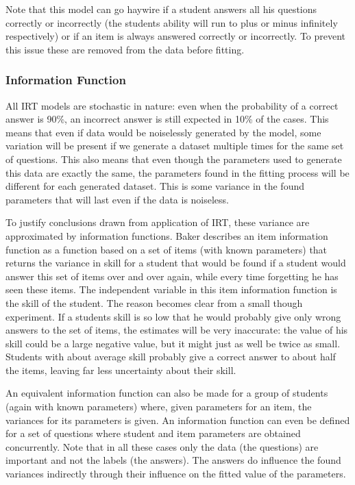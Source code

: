 \documentclass{scrartcl}
\begin{document}
Note that this model can go haywire if a student answers all his questions correctly or incorrectly (the students ability will run to plus or minus infinitely respectively) or if an item is always answered correctly  or incorrectly. To prevent this issue these are removed from the data before fitting.

\subsubsection{Information Function}
\label{sec:inherent}
All IRT models are stochastic in nature: even when the probability of a correct answer is 90\%, an incorrect answer is still expected in 10\% of the cases. This means that even if data would be noiselessly generated by the model, some variation will be present if we generate a dataset multiple times for the same set of questions. This also means that even though the parameters used to generate this data are exactly the same, the parameters found in the fitting process will be different for each generated dataset. This is some variance in the found parameters that will last even if the data is noiseless.  

To justify conclusions drawn from application of IRT, these variance are approximated by information functions. Baker \cite{basicbaker} describes an item information function as a function based on a set of items (with known parameters) that returns the variance in skill for a student that would be found if a student would answer this set of items over and over again, while every time forgetting he has seen these items. The independent variable in this item information function is the skill of the student. The reason becomes clear from a small though experiment. If a students skill is so low that he would probably give only wrong answers to the set of items, the estimates will be very inaccurate: the value of his skill could be a large negative value, but it might just as well be twice as small. Students with about average skill probably give a correct answer to about half the items, leaving far less uncertainty about their skill.

An equivalent information function can also be made for a group of students (again with known parameters) where, given parameters for an item, the variances for its parameters is given. An information function can even be defined for a set of questions where student and item parameters are obtained concurrently. Note that in all these cases only the data (the questions) are important and not the labels (the answers). The answers do influence the found variances indirectly through their influence on the fitted value of the parameters.
\end{document}
